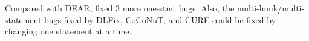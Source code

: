 Compared with DEAR, {\tool} fixed 3 more one-stmt bugs. Also, the
multi-hunk/multi-statement bugs fixed by DLFix, CoCoNuT, and CURE
could be fixed by changing one statement at a time.



